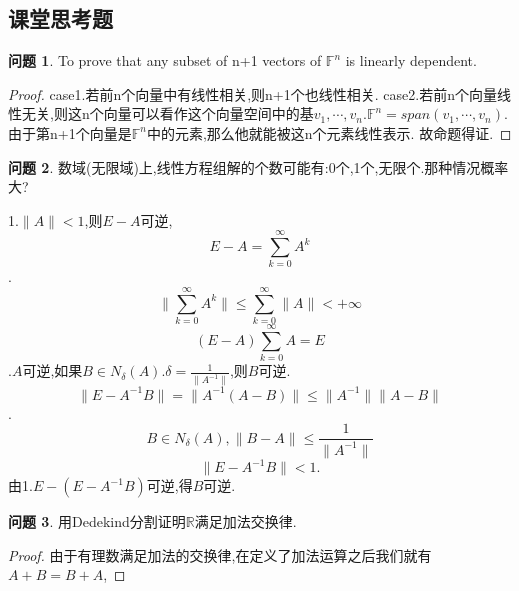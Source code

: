 \documentclass[11pt]{ctexart}
\theoremstyle{definition}
\newtheorem{qqq}{问题}[section]
\numberwithin{equation}{section}
\begin{document}
\subsection{课堂思考题}
\begin{qqq}
    To prove that any subset of n+1 vectors of $\mathbb{F}^n$ is linearly dependent.
\end{qqq}
\begin{proof}
    case1.若前n个向量中有线性相关,则n+1个也线性相关.\newline
    case2.若前n个向量线性无关,则这n个向量可以看作这个向量空间中的基$v_1,\cdots ,v_n$.$\mathbb{F}^n=span(v_1,\cdots ,v_n)$.由于第n+1个向量是$\mathbb{F}^n$中的元素,那么他就能被这n个元素线性表示.\newline
    故命题得证.
\end{proof}
\begin{qqq}
    数域(无限域)上,线性方程组解的个数可能有:0个,1个,无限个.那种情况概率大?
\end{qqq}
\begin{aaa}
    1.$\| A \|<1$,则$E-A$可逆,$$E-A=\sum_{k=0}^{\infty}A^k$$.\newline
    $$\|\sum_{k=0}^{\infty}A^k\|\leq \sum_{k=0}^{\infty}\|A\|<+\infty$$\newline
    $$(E-A)\sum_{k=0}^{\infty}A=E$$.$A$可逆,如果$B\in N_\delta (A).\delta =\frac{1}{\|A^{-1}\|}$,则$B$可逆.\newline
    $$\|E-A^{-1}B\|=\|A^{-1}(A-B)\|\leq \|A^{-1}\|\|A-B\|$$.\newline
    $$B\in N_\delta (A),\|B-A\|\leq \frac{1}{\|A^{-1}\|} $$\newline
    $$\|E-A^{-1}B\|<1.$$\newline
    由1.$E-(E-A^{-1}B)$可逆,得$B$可逆.
\end{aaa}
\begin{qqq}
    用Dedekind分割证明$\mathbb{R}$满足加法交换律.
\end{qqq}
\begin{proof}
    由于有理数满足加法的交换律,在定义了加法运算之后我们就有$A+B=B+A$,
\end{proof}
\end{document}
